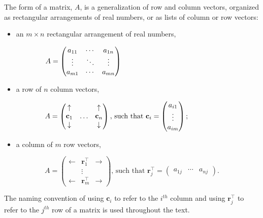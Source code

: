 \documentclass[12pt, twoside, draft]{article}
\begin{document}
The form of a matrix, $A$, is a generalization of row and column vectors, organized as rectangular arrangements of real numbers, or as lists of column or row vectors:
\begin{itemize}[noitemsep]
\item an $m \times n$ rectangular arrangement of real numbers, 
\end{itemize}
\begin{equation}
A = \begin{pmatrix} a_{11} & \cdots & a_{1n} \\ \vdots & \ddots & \vdots \\ a_{m1} & \cdots & a_{mn} \end{pmatrix} \text{\hspace{135pt}}
\end{equation}
\begin{itemize}
\item a row of $n$ column vectors, 
\end{itemize}
\begin{equation}
A = \begin{pmatrix} \uparrow & & \uparrow \\ \mathbf{c}_1 & \ldots & \mathbf{c}_n \\ \downarrow & & \downarrow \end{pmatrix}
\text{, such that } \mathbf{c}_i = \begin{pmatrix} a_{i1} \\ \vdots \\ a_{im}\end{pmatrix} \text{; \hspace{40pt}}
\end{equation}
\begin{itemize}
\item a column of $m$ row vectors, 
\end{itemize}
\begin{equation}
A = \begin{pmatrix} \leftarrow & \mathbf{r}_1^\top & \rightarrow \\ & \vdots & \\ \leftarrow & \mathbf{r}_m^\top & \rightarrow \end{pmatrix} \text{, such that } \mathbf{r}_j^\top = \begin{pmatrix} a_{1j} & \cdots & a_{nj} \end{pmatrix}.
\end{equation}

The naming convention of using $\mathbf{c}_i$ to refer to the $i^{th}$ column and using $\mathbf{r}_j^\top$ to refer to the $j^{th}$ row of a matrix is used throughout the text.
\end{document}

